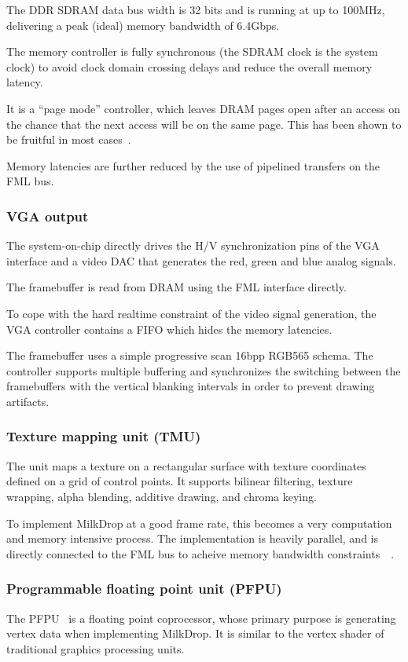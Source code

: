\documentclass[a4paper,11pt,twocolumn]{paper}
\begin{document}
The DDR SDRAM data bus width is 32 bits and is running at up to 100MHz, delivering a peak (ideal) memory bandwidth of 6.4Gbps.

The memory controller is fully synchronous (the SDRAM clock is the system clock) to avoid clock domain crossing delays and reduce the overall memory latency.

It is a ``page mode'' controller, which leaves DRAM pages open after an access on the chance that the next access will be on the same page. This has been shown to be fruitful in most cases~\cite{pagemode}.

Memory latencies are further reduced by the use of pipelined transfers on the FML bus.

\subsubsection{VGA output}
The system-on-chip directly drives the H/V synchronization pins of the VGA interface and a video DAC that generates the red, green and blue analog signals.

The framebuffer is read from DRAM using the FML interface directly.

To cope with the hard realtime constraint of the video signal generation, the VGA controller contains a FIFO which hides the memory latencies.

The framebuffer uses a simple progressive scan 16bpp RGB565 schema. The controller supports multiple buffering and synchronizes the switching between the framebuffers with the vertical blanking intervals in order to prevent drawing artifacts.

\subsubsection{Texture mapping unit (TMU)}
The unit maps a texture on a rectangular surface with texture coordinates defined on a grid of control points. It supports bilinear filtering, texture wrapping, alpha blending, additive drawing, and chroma keying.

To implement MilkDrop at a good frame rate, this becomes a very computation and memory intensive process. The implementation is heavily parallel, and is directly connected to the FML bus to acheive memory bandwidth constraints~\cite{confslides}~\cite{tmu}.

\subsubsection{Programmable floating point unit (PFPU)}
The PFPU~\cite{pfpu} is a floating point coprocessor, whose primary purpose is generating vertex data when implementing MilkDrop. It is similar to the vertex shader of traditional graphics processing units.
\end{document}
